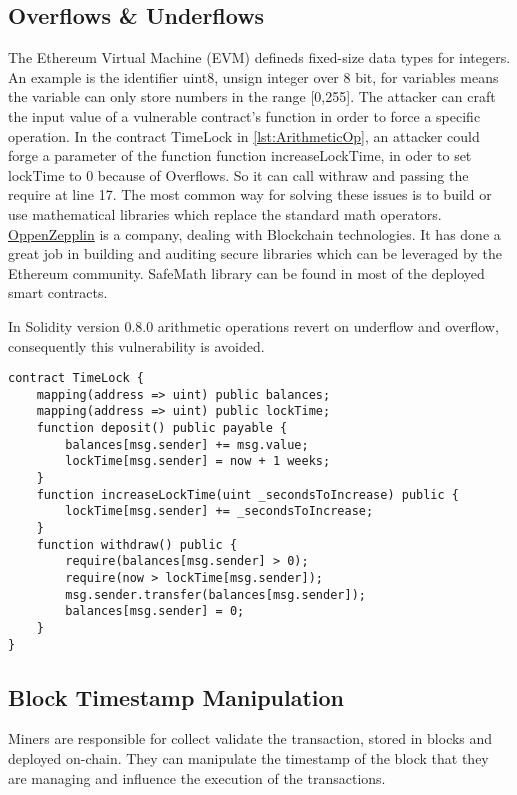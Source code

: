 \documentclass[a4paper,sigconf, language=french,
language=german, language=spanish, language=english]{acmart}
\begin{document}
\subsection{Overflows \& Underflows} 
The Ethereum Virtual Machine (EVM) defineds fixed-size data types for integers. 
An example is the identifier uint8, unsign integer over 8 bit, for variables means the variable can only store numbers in the range [0,255].
The attacker can craft the input value of a vulnerable contract's function in order to force a specific operation. 
In the contract TimeLock in \autoref{lst:ArithmeticOp}, an attacker could forge a parameter of the function function increaseLockTime, 
in oder to set lockTime to 0 because of Overflows. So it can call withraw and passing the require at line 17.
The most common way for solving these issues is to build or use mathematical libraries which replace the standard math operators. 
\href{https://www.openzeppelin.com/}{OppenZepplin} is a company, dealing with Blockchain technologies. It has done a great job in building and auditing secure libraries which can be leveraged by the Ethereum community.
SafeMath library can be found in most of the deployed smart contracts. 

In Solidity version 0.8.0 arithmetic operations revert on underflow and overflow, consequently this vulnerability is avoided.
\begin{lstlisting}[language=Solidity,caption={Overflows \& Underflows},label={lst:ArithmeticOp}]
contract TimeLock {
    mapping(address => uint) public balances;
    mapping(address => uint) public lockTime;
    function deposit() public payable {
        balances[msg.sender] += msg.value;
        lockTime[msg.sender] = now + 1 weeks;
    }
    function increaseLockTime(uint _secondsToIncrease) public {
        lockTime[msg.sender] += _secondsToIncrease;
    }
    function withdraw() public {
        require(balances[msg.sender] > 0);
        require(now > lockTime[msg.sender]);
        msg.sender.transfer(balances[msg.sender]);
        balances[msg.sender] = 0;
    }
}
\end{lstlisting}

\subsection{Block Timestamp Manipulation} 
Miners are responsible for collect validate the transaction, stored in blocks and deployed on-chain.
They can manipulate the timestamp of the block that they are managing and influence the execution of the transactions.
\end{document}
